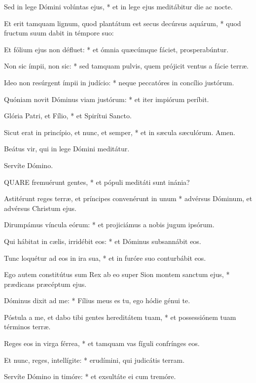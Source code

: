 Sed in lege Dómini volúntas ejus, * et in lege ejus meditábitur die ac nocte.

Et erit tamquam lignum, quod plantátum est secus decúrsus aquárum, * quod fructum suum dabit in témpore suo:

Et fólium ejus non défluet: * et ómnia quæcúmque fáciet, prosperabúntur.

Non sic ímpii, non sic: * sed tamquam pulvis, quem prójicit ventus a fácie terræ.

Ideo non resúrgent ímpii in judício: * neque peccatóres in concílio justórum.

Quóniam novit Dóminus viam justórum: * et iter impiórum períbit.

Glória Patri, et Fílio, * et Spirítui Sancto.

Sicut erat in princípio, et nunc, et semper, * et in sæcula sæculórum. Amen.


 Beátus vir, qui in lege Dómini meditátur.

 Servíte Dómino.


\lettrine[lines=2]{Q}{UARE} fremuérunt gentes, * et pópuli meditáti sunt inánia?

Astitérunt reges terræ, et príncipes convenérunt in unum * advérsus Dóminum, et advérsus Christum ejus.

Dirumpámus víncula eórum: * et projiciámus a nobis jugum ipsórum.

Qui hábitat in cælis, irridébit eos: * et Dóminus subsannábit eos.

Tunc loquétur ad eos in ira sua, * et in furóre suo conturbábit eos.

Ego autem constitútus sum Rex ab eo super Sion montem sanctum ejus, * prædicans præcéptum ejus.

Dóminus dixit ad me: * Fílius meus es tu, ego hódie génui te.

Póstula a me, et dabo tibi gentes hereditátem tuam, * et possessiónem tuam términos terræ.

Reges eos in virga férrea, * et tamquam vas fíguli confrínges eos.

Et nunc, reges, intellígite: * erudímini, qui judicátis terram.

Servíte Dómino in timóre: * et exsultáte ei cum tremóre.

